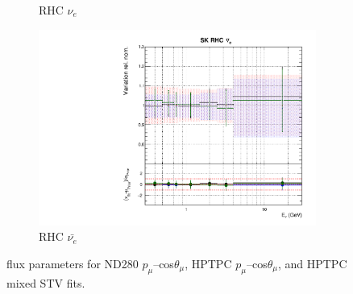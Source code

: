 \begin{figure}
\begin{subfigure}{0.45\textwidth}
  \caption{\SK RHC $\nu_{e}$}
\end{subfigure}
\begin{subfigure}{0.45\textwidth}
  \centering
  \includegraphics[width=0.75\linewidth]{figs/hptpcfitsflux_15}
  \caption{\SK RHC $\bar{\nu_e}$}
\end{subfigure}
\caption{\SK flux parameters for ND280 $p_{\mu}$--cos$\theta_{\mu}$, HPTPC $p_{\mu}$--cos$\theta_{\mu}$, and HPTPC mixed STV fits.}
\label{fig:hptpcfluxSK}
\end{figure}

